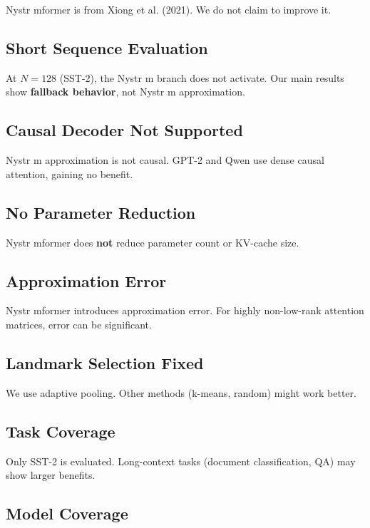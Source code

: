 Nystr mformer is from Xiong et al. (2021). We do not claim to improve it.

\subsection{Short Sequence Evaluation}

At $N=128$ (SST-2), the Nystr m branch does not activate. Our main results 
show \textbf{fallback behavior}, not Nystr m approximation.

\subsection{Causal Decoder Not Supported}

Nystr m approximation is not causal. GPT-2 and Qwen use dense causal 
attention, gaining no benefit.

\subsection{No Parameter Reduction}

Nystr mformer does \textbf{not} reduce parameter count or KV-cache size.

\subsection{Approximation Error}

Nystr mformer introduces approximation error. For highly non-low-rank 
attention matrices, error can be significant.

\subsection{Landmark Selection Fixed}

We use adaptive pooling. Other methods (k-means, random) might work better.

\subsection{Task Coverage}

Only SST-2 is evaluated. Long-context tasks (document classification, 
QA) may show larger benefits.

\subsection{Model Coverage}

